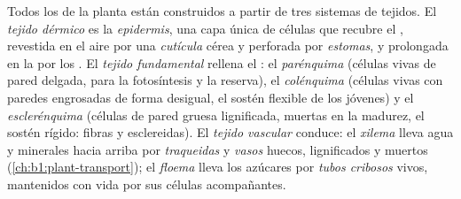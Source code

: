 \begin{definition}\label{def:b1:flowering-plant-organization:tissues}
Todos los  de la planta están construidos a partir de tres sistemas
de tejidos. El \emph{tejido dérmico} es la
\emph{epidermis}, una capa única de células que recubre el
, revestida en el aire por una \emph{cutícula} cérea y
perforada por \emph{estomas}, y prolongada en la  por los
. El \emph{tejido fundamental}
rellena el : el \emph{parénquima} (células vivas de
pared delgada, para la fotosíntesis y la reserva), el
\emph{colénquima} (células vivas con paredes engrosadas de
forma desigual, el sostén flexible de los  jóvenes) y el
\emph{esclerénquima} (células de pared gruesa
lignificada, muertas en la madurez, el sostén rígido: fibras y esclereidas).
El \emph{tejido vascular} conduce: el
\emph{xilema} lleva agua y minerales hacia arriba por
\emph{traqueidas} y \emph{vasos} huecos,
lignificados y muertos (\cref{ch:b1:plant-transport}); el
\emph{floema} lleva los azúcares por \emph{tubos
cribosos} vivos, mantenidos con vida por sus células
acompañantes.
\end{definition}

